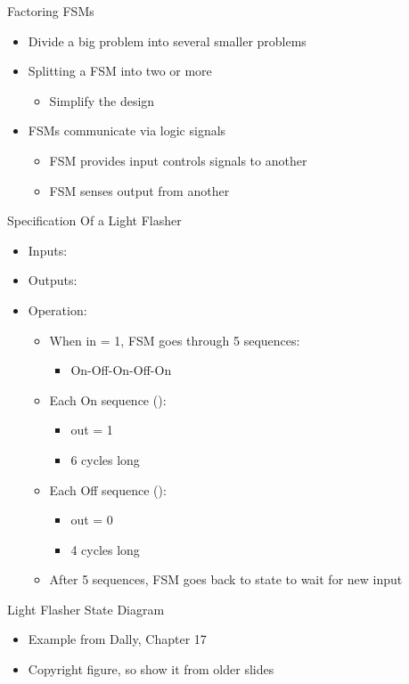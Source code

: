 \begin{frame}[fragile]{Factoring FSMs}
\begin{itemize}
\item Divide a big problem into several smaller problems
\item Splitting a FSM into two or more
\begin{itemize}
\item Simplify the design
\end{itemize}
\item FSMs communicate via logic signals
\begin{itemize}
\item FSM provides input controls signals to another
\item FSM senses output from another
\end{itemize}
\end{itemize}
\end{frame}

\begin{frame}[fragile]{Specification Of a Light Flasher}
\begin{itemize}
\item Inputs: 
\item Outputs: 
\item Operation:
\begin{itemize}
\item When in = 1, FSM goes through 5 sequences:
\begin{itemize}
\item On-Off-On-Off-On
\end{itemize}
\item Each On sequence ():
\begin{itemize}
\item out = 1
\item 6 cycles long
\end{itemize}
\item Each Off sequence ():
\begin{itemize}
\item out = 0
\item 4 cycles long
\end{itemize}
\item After 5 sequences, FSM goes back to  state to wait for new input
\end{itemize}
\end{itemize}
\end{frame}

\begin{frame}[fragile]{Light Flasher State Diagram}
\begin{itemize}
\item Example from Dally, Chapter 17
\item Copyright figure, so show it from older slides
\end{itemize}
\end{frame}


